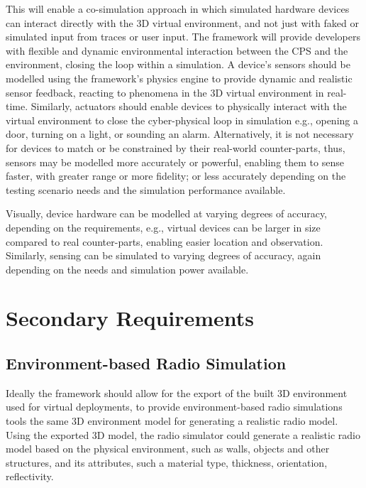 This will enable a co-simulation approach in which simulated hardware devices can interact directly with the 3D virtual environment, and not just with faked or simulated input from traces or user input. The framework will provide developers with flexible and dynamic environmental interaction between the CPS and the environment, closing the loop within a simulation. A device's sensors should be modelled using the framework's physics engine to provide dynamic and realistic sensor feedback, reacting to phenomena in the 3D virtual environment in real-time. Similarly, actuators should enable devices to physically interact with the virtual environment to close the cyber-physical loop in simulation e.g., opening a door, turning on a light, or sounding an alarm. Alternatively, it is not necessary for devices to match or be constrained by their real-world counter-parts, thus, sensors may be modelled more accurately or powerful, enabling them to sense faster, with greater range or more fidelity; or less accurately depending on the testing scenario needs and the simulation performance available.

Visually, device hardware can be modelled at varying degrees of accuracy, depending on the requirements, e.g., virtual devices can be larger in size compared to real counter-parts, enabling easier location and observation. Similarly, sensing can be simulated to varying degrees of accuracy, again depending on the needs and simulation power available. 


\section{Secondary Requirements} %
\label{sec:secondary_requirements}


\subsection{Environment-based Radio Simulation} %
\label{sub:environment_based_radio_simulation}
Ideally the framework should allow for the export of the built 3D environment used for virtual deployments, to provide environment-based radio simulations tools the same 3D environment model for generating a realistic radio model. Using the exported 3D model, the radio simulator could generate a realistic radio model based on the physical environment, such as walls, objects and other structures, and its attributes, such a material type, thickness, orientation, reflectivity.\cite{trunetWireless}

